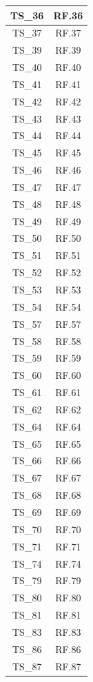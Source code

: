 \documentclass[12pt, a4paper]{article}
\begin{document}
\begin{xltabular}{\textwidth}{|c|c|}
    TS\_36 & RF.36 \\\hline
    TS\_37 & RF.37 \\\hline
    TS\_39 & RF.39 \\\hline
    TS\_40 & RF.40 \\\hline
    TS\_41 & RF.41 \\\hline
    TS\_42 & RF.42 \\\hline
    TS\_43 & RF.43 \\\hline
    TS\_44 & RF.44 \\\hline
    TS\_45 & RF.45 \\\hline
    TS\_46 & RF.46 \\\hline
    TS\_47 & RF.47 \\\hline
    TS\_48 & RF.48 \\\hline
    TS\_49 & RF.49 \\\hline
    TS\_50 & RF.50 \\\hline
    TS\_51 & RF.51 \\\hline
    TS\_52 & RF.52 \\\hline
    TS\_53 & RF.53 \\\hline
    TS\_54 & RF.54 \\\hline
    TS\_57 & RF.57 \\\hline
    TS\_58 & RF.58 \\\hline
    TS\_59 & RF.59 \\\hline
    TS\_60 & RF.60 \\\hline
    TS\_61 & RF.61 \\\hline
    TS\_62 & RF.62 \\\hline
    TS\_64 & RF.64 \\\hline
    TS\_65 & RF.65 \\\hline
    TS\_66 & RF.66 \\\hline
    TS\_67 & RF.67 \\\hline
    TS\_68 & RF.68 \\\hline
    TS\_69 & RF.69 \\\hline
    TS\_70 & RF.70 \\\hline
    TS\_71 & RF.71 \\\hline
    TS\_74 & RF.74 \\\hline
    TS\_79 & RF.79 \\\hline
    TS\_80 & RF.80 \\\hline
    TS\_81 & RF.81 \\\hline
    TS\_83 & RF.83 \\\hline
    TS\_86 & RF.86 \\\hline
    TS\_87 & RF.87 \\\hline

\end{xltabular}
\end{document}
